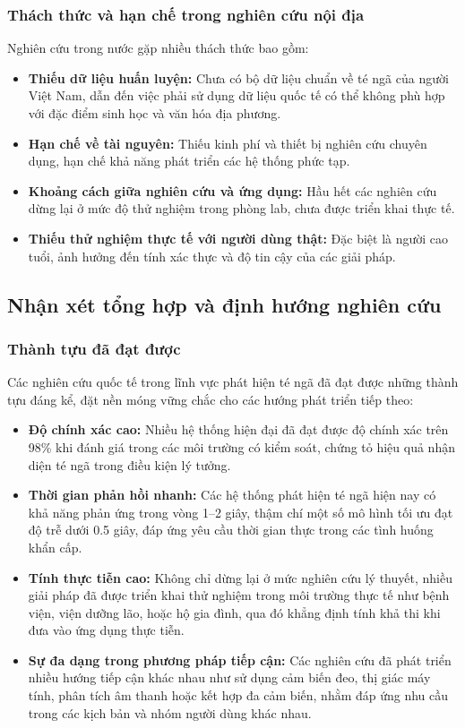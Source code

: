 \subsubsection{Thách thức và hạn chế trong nghiên cứu nội địa}
Nghiên cứu trong nước gặp nhiều thách thức bao gồm:
\begin{itemize}
    \item \textbf{Thiếu dữ liệu huấn luyện:} Chưa có bộ dữ liệu chuẩn về té ngã của người Việt Nam, dẫn đến việc phải sử dụng dữ liệu quốc tế có thể không phù hợp với đặc điểm sinh học và văn hóa địa phương.
    \item \textbf{Hạn chế về tài nguyên:} Thiếu kinh phí và thiết bị nghiên cứu chuyên dụng, hạn chế khả năng phát triển các hệ thống phức tạp.
    \item \textbf{Khoảng cách giữa nghiên cứu và ứng dụng:} Hầu hết các nghiên cứu dừng lại ở mức độ thử nghiệm trong phòng lab, chưa được triển khai thực tế.
    \item \textbf{Thiếu thử nghiệm thực tế với người dùng thật:} Đặc biệt là người cao tuổi, ảnh hưởng đến tính xác thực và độ tin cậy của các giải pháp.
\end{itemize}


\subsection{Nhận xét tổng hợp và định hướng nghiên cứu}
\subsubsection{Thành tựu đã đạt được}
Các nghiên cứu quốc tế trong lĩnh vực phát hiện té ngã đã đạt được những thành tựu đáng kể, đặt nền móng vững chắc cho các hướng phát triển tiếp theo:
\begin{itemize}
    \item \textbf{Độ chính xác cao:} Nhiều hệ thống hiện đại đã đạt được độ chính xác trên 98\% khi đánh giá trong các môi trường có kiểm soát, chứng tỏ hiệu quả nhận diện té ngã trong điều kiện lý tưởng.

    \item \textbf{Thời gian phản hồi nhanh:} Các hệ thống phát hiện té ngã hiện nay có khả năng phản ứng trong vòng 1–2 giây, thậm chí một số mô hình tối ưu đạt độ trễ dưới 0.5 giây, đáp ứng yêu cầu thời gian thực trong các tình huống khẩn cấp.

    \item \textbf{Tính thực tiễn cao:} Không chỉ dừng lại ở mức nghiên cứu lý thuyết, nhiều giải pháp đã được triển khai thử nghiệm trong môi trường thực tế như bệnh viện, viện dưỡng lão, hoặc hộ gia đình, qua đó khẳng định tính khả thi khi đưa vào ứng dụng thực tiễn.

    \item \textbf{Sự đa dạng trong phương pháp tiếp cận:} Các nghiên cứu đã phát triển nhiều hướng tiếp cận khác nhau như sử dụng cảm biến đeo, thị giác máy tính, phân tích âm thanh hoặc kết hợp đa cảm biến, nhằm đáp ứng nhu cầu trong các kịch bản và nhóm người dùng khác nhau.
\end{itemize}

